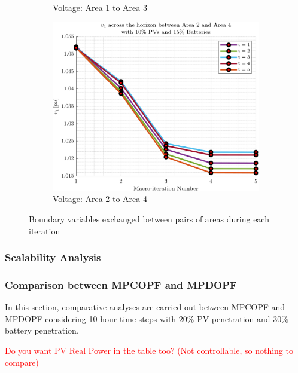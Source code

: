\documentclass[../../outputs/main.tex]{subfiles}
\begin{document}
\begin{figure}[h!]
\begin{subfigure}[b]{0.3\textwidth}
        \caption{\scriptsize Voltage: Area 1 to Area 3}
        \label{fig:voltage_1_3}
    \end{subfigure}
    \hfill
    \begin{subfigure}[b]{0.3\textwidth}
        \centering
        \includegraphics[width=\textwidth]{../figures/T5-pv10-batt15-vBoundary/BoundaryVoltage_vs_t_vs_macroItr_5Areas_2_4_genCost_pv_10_batt_15_.png}
        \caption{\scriptsize Voltage: Area 2 to Area 4}
        \label{fig:voltage_2_4}
    \end{subfigure}

    \caption{Boundary variables exchanged between pairs of areas during each iteration}
    \label{fig:boundary_variables_all}
\end{figure}


\subsubsection{Scalability Analysis}

\subsubsection{Comparison between MPCOPF and MPDOPF}
In this section, comparative analyses are carried out between MPCOPF and MPDOPF considering 10-hour time steps with $20\%$ PV penetration and $30\%$ battery penetration.

\textcolor{red}{Do you want PV Real Power in the table too? (Not controllable, so nothing to compare)}
\end{document}
